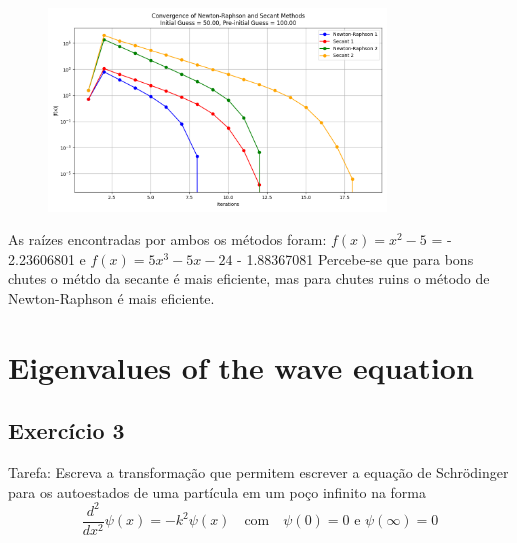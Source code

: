 \documentclass[12pt, a4paper]{article} %
\begin{document}
        \begin{figure}[H]
            \centering
            \includegraphics[width=0.8\textwidth]{../images/convergence-initial-500-preinitial-1000.png}
            \caption{}        
        \end{figure}

        As ra\'izes encontradas por ambos os m\'etodos foram: $f(x) = x^2 - 5$ = - 2.23606801 e $f(x) = 5x^3 - 5x - 24$ - 1.88367081
        Percebe-se que para bons chutes o m\'etdo da secante \'e mais eficiente, mas para chutes ruins o m\'etodo de Newton-Raphson \'e mais eficiente.

\section{Eigenvalues of the wave equation}

    \subsection{Exerc\'icio 3}

        Tarefa: Escreva a transforma\c{c}\~ao que permitem escrever a equa\c{c}\~ao de Schr\"odinger para os
        autoestados de uma part\'icula em um po\c{c}o infinito na forma
        \begin{equation}
            \frac{d^2}{dx^2}\psi(x) = -k^2\psi(x) \quad \text{com} \quad \psi(0) = 0 \text{ e } \psi(\infty) = 0
        \end{equation}
\end{document}
